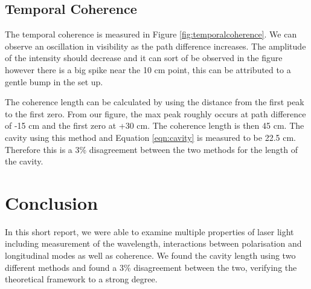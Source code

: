 \documentclass[aps,prl,reprint,10pt,amsmath,amssymb,superscriptaddress,a4paper]{revtex4-2}
\begin{document}
\subsection{Temporal Coherence}

The temporal coherence is measured in Figure \ref{fig:temporalcoherence}. We can observe an oscillation in visibility as the path difference increases. The amplitude of the intensity should decrease and it can sort of be observed in the figure however there is a big spike near the 10 cm point, this can be 
attributed to a gentle bump in the set up.

The coherence length can be calculated by using the distance from the first peak to the first zero. From our figure, the max peak roughly occurs at path difference of -15 cm and the first zero at +30 cm. The coherence length is then 45 cm. The cavity using this method and Equation \ref{eqn:cavity} is measured to be 
22.5 cm. Therefore this is a 3\% disagreement between the two methods for the length of the cavity.

\section{Conclusion}

In this short report, we were able to examine multiple properties of laser light including measurement of the wavelength, interactions between polarisation and longitudinal modes as well as coherence. We found the cavity length using two different methods and found a 3\% disagreement between the two, verifying the 
theoretical framework to a strong degree.



\end{document}
